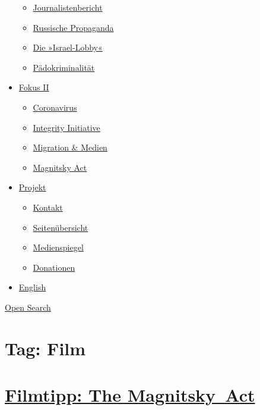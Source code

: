 \begin{itemize}
  \begin{itemize}
  \tightlist
  \item
    \href{https://swprs.org/bericht-eines-journalisten/}{Journalistenbericht}
  \item
    \href{https://swprs.org/russische-propaganda/}{Russische Propaganda}
  \item
    \href{https://swprs.org/die-israel-lobby-fakten-und-mythen/}{Die
    »Israel-Lobby«}
  \item
    \href{https://swprs.org/geopolitik-und-paedokriminalitaet/}{Pädokriminalität}
  \end{itemize}
\item
  \href{https://swprs.org/migration-und-medien/}{Fokus II}

  \begin{itemize}
  \tightlist
  \item
    \href{https://swprs.org/covid-19-hinweis-ii/}{Coronavirus}
  \item
    \href{https://swprs.org/die-integrity-initiative/}{Integrity
    Initiative}
  \item
    \href{https://swprs.org/migration-und-medien/}{Migration \& Medien}
  \item
    \href{https://swprs.org/der-fall-magnitsky/}{Magnitsky Act}
  \end{itemize}
\item
  \href{https://swprs.org/kontakt/}{Projekt}

  \begin{itemize}
  \tightlist
  \item
    \href{https://swprs.org/kontakt/}{Kontakt}
  \item
    \href{https://swprs.org/uebersicht/}{Seitenübersicht}
  \item
    \href{https://swprs.org/medienspiegel/}{Medienspiegel}
  \item
    \href{https://swprs.org/donationen/}{Donationen}
  \end{itemize}
\item
  \href{https://swprs.org/contact/}{English}
\end{itemize}

\protect\hyperlink{}{Open Search}

\hypertarget{tag-film}{%
\section{Tag: Film}\label{tag-film}}

\hypertarget{filmtipp-the-magnitsky-act}{%
\section{\texorpdfstring{\href{https://swprs.org/2017/03/01/magnitsky/}{Filmtipp:
The
Magnitsky~Act}}{Filmtipp: The Magnitsky~Act}}\label{filmtipp-the-magnitsky-act}}

